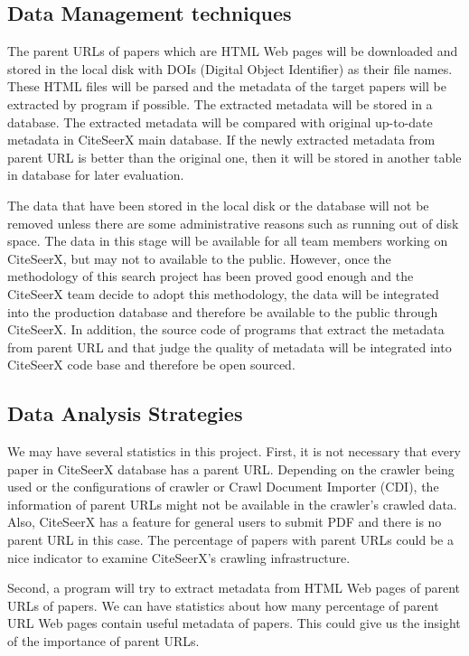 \documentclass[prodmode]{acmsmall} %
\begin{document}
\subsection{Data Management techniques}

The parent URLs of papers which are HTML Web pages will be downloaded and stored in the local disk with DOIs (Digital Object Identifier) as their file names. These HTML files will be parsed and the metadata of the target papers will be extracted by program if possible. The extracted metadata will be stored in a database. The extracted metadata will be compared with original up-to-date metadata in CiteSeerX main database. If the newly extracted metadata from parent URL is better than the original one, then it will be stored in another table in database for later evaluation.

The data that have been stored in the local disk or the database will not be removed unless there are some administrative reasons such as running out of disk space. The data in this stage will be available for all team members working on CiteSeerX, but may not to available to the public. However, once the methodology of this search project has been proved good enough and the CiteSeerX team decide to adopt this methodology, the data will be integrated into the production database and therefore be available to the public through CiteSeerX. In addition, the source code of programs that extract the metadata from parent URL and that judge the quality of metadata will be integrated into CiteSeerX code base and therefore be open sourced.

\subsection{Data Analysis Strategies}

We may have several statistics in this project. First, it is not necessary that every paper in CiteSeerX database has a parent URL. Depending on the crawler being used or the configurations of crawler or Crawl Document Importer (CDI), the information of parent URLs might not be available in the crawler’s crawled data. Also, CiteSeerX has a feature for general users to submit PDF and there is no parent URL in this case. The percentage of papers with parent URLs could be a nice indicator to examine CiteSeerX’s crawling infrastructure.

Second, a program will try to extract metadata from HTML Web pages of parent URLs of papers. We can have statistics about how many percentage of parent URL Web pages contain useful metadata of papers. This could give us the insight of the importance of parent URLs.
\end{document}
